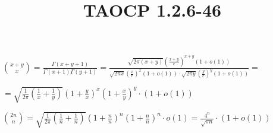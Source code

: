 \documentclass{article}
\title{TAOCP 1.2.6\mbox{-}46}
\begin{document}
\maketitle

\( \binom{x+y}{x} = \frac{\Gamma(x+y+1)}{\Gamma(x+1)\Gamma(y+1)} = \frac{\sqrt{2 \pi (x+y)}{(\frac{x+y}{e})}^{x+y}(1+o(1))}{\sqrt{2 \pi x}{(\frac{x}{e})}^{x}(1+o(1)) \cdot {\sqrt{2 \pi y}{(\frac{y}{e})}^{y}(1+o(1))}} = \)

\( = \sqrt{\frac{1}{{2 \pi}}(\frac{1}{x} + \frac{1}{y})}{(1+\frac{y}{x})}^{x} {(1+\frac{x}{y})}^{y} \cdot (1+o(1)) \)

\( \binom{2n}{n} = \sqrt{\frac{1}{{2 \pi}}(\frac{1}{n} + \frac{1}{n})}{(1+\frac{n}{n})}^{n} {(1+\frac{n}{n})}^{n} \cdot o(1) = \frac{4^{n}}{\sqrt{\pi n}} \cdot (1 + o(1)) \)
\end{document}
